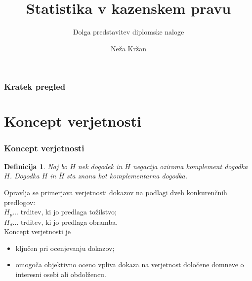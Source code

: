 \documentclass{beamer}
\newtheorem{definicija}{Definicija}
\begin{document}
\title{Statistika v kazenskem pravu}
\subtitle{Dolga predstavitev diplomske naloge}
\author[Neža Kržan]{Neža Kržan}
 
\date[28. november 2022] {}

\subject{Talks}

\begin{frame}
   \titlepage
\end{frame}

\begin{frame}
   \frametitle{Kratek pregled}
   \tableofcontents[pausesections]
\end{frame}

\section{Koncept verjetnosti}

\begin{frame}
    \frametitle{Koncept verjetnosti}
    \begin{definicija}
        Naj bo $H$ nek dogodek in $\bar{H}$ negacija oziroma komplement dogodka $H$. Dogodka $H$ in $\bar{H}$ sta znana kot komplementarna dogodka.
    \end{definicija}
    Opravlja se primerjava verjetnosti dokazov na podlagi dveh konkurenčnih predlogov:\\
    $H_p \dots$ trditev, ki jo predlaga tožilstvo;\\
    $H_d \dots$ trditev, ki jo predlaga obramba.\\ \vspace{5mm}
    Koncept verjetnosti je
    \begin{itemize}
        \item ključen pri ocenjevanju dokazov;
        \item omogoča objektivno oceno vpliva dokaza na verjetnost določene domneve o interesni osebi ali obdolžencu.
    \end{itemize}
\end{frame}
\end{document}
